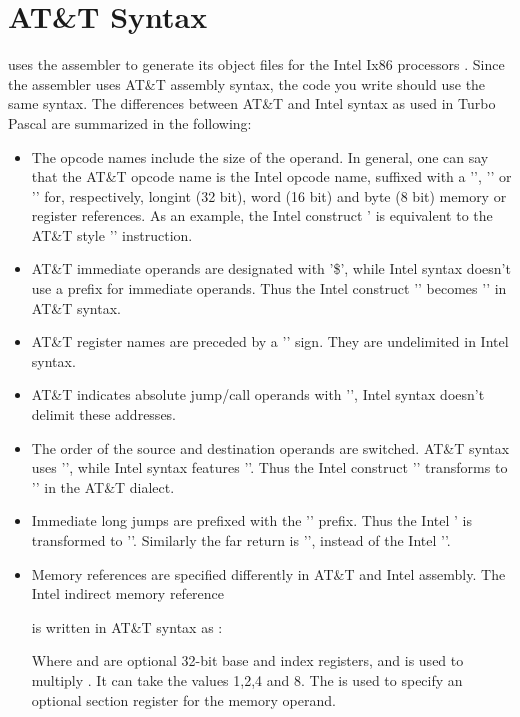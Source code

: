 \documentclass{report}
\begin{document}
\section{AT\&T Syntax}
\label{se:AttSyntax}
\fpc uses the \gnu {} assembler to generate its object files for
the Intel Ix86 processors . Since
the \gnu assembler uses AT\&T assembly syntax, the code you write should
use the same syntax. The differences between AT\&T and Intel syntax as used
in Turbo Pascal are summarized in the following:
\begin{itemize}
\item The opcode names include the size of the operand. In general, one can
say that the AT\&T opcode name is the Intel opcode name, suffixed with a
'', '' or '' for, respectively, longint (32 bit),
word (16 bit) and byte (8 bit) memory or register references. As an example,
the Intel construct \mbox{'} is equivalent to the AT\&T style '' instruction.
\item AT\&T immediate operands are designated with '\$', while Intel syntax
doesn't use a prefix for immediate operands. Thus the Intel construct
'' becomes '' in AT\&T syntax.
\item AT\&T register names are preceded by a '\var{\%}' sign. 
They are undelimited in Intel syntax. 
\item AT\&T indicates absolute jump/call operands with '\var{*}', Intel
syntax doesn't delimit these addresses.
\item The order of the source and destination operands are switched. AT\&T
syntax uses '', while Intel syntax features ''. Thus the Intel construct '' transforms to
'' in the AT\&T dialect.
\item Immediate long jumps are prefixed with the '' prefix. Thus the
Intel ' is transformed to ''. Similarly the far return is '', instead of the
Intel ''.
\item Memory references are specified differently in AT\&T and Intel
assembly. The Intel indirect memory reference
\begin{quote}
\end{quote}
is written in AT\&T syntax as :
\begin{quote}
\end{quote}
Where  and  are optional 32-bit base and index
registers, and  is used to multiply . It can take the
values 1,2,4 and 8. The  is used to specify an optional section
register for the memory operand.
\end{itemize}
\end{document}
